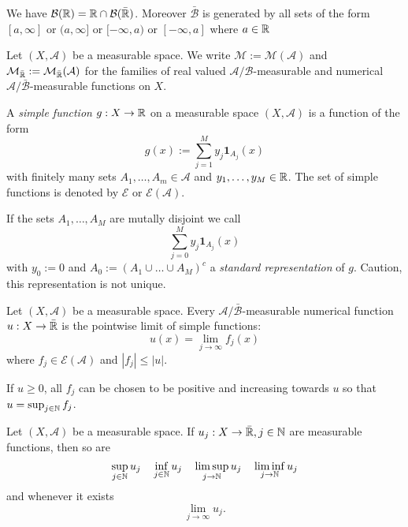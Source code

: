 \begin{thm}
We have \(\mathcal{B}(\Bbb{R})=\Bbb{R}\cap \mathcal{B}(\bar{\Bbb{R}})\). Moreover \(\bar{\mathcal{B}}\) is generated by all sets of the form \([a,\infty ]\) or \((a,\infty ]\) or \([-\infty ,a)\) or \([-\infty ,a]\) where \(a\in \Bbb{R}\)
\end{thm}

\begin{defn}
Let \((X,\mathcal{A})\) be a measurable space. We write \(\mathcal{M}:=\mathcal{M}(\mathcal{A})\) and \(\mathcal{M}_{\bar{\Bbb{R}}}:=\mathcal{M}_{\bar{\Bbb{R}}}(\mathcal{A})\) for the families of real valued \(\mathcal{A}/\mathcal{B}\)-measurable and numerical \(\mathcal{A}/\bar{\mathcal{B}}\)-measurable functions on \(X\).
\end{defn}

\begin{defn}
A \emph{simple function} \(g:X\rightarrow \Bbb{R}\) on a measurable space \((X,\mathcal{A})\) is a function of the form
\[
g(x):=\sum _{j=1}^M y_{j}\mathbf{1}_{A_{j}}(x)
\]
with finitely many sets \(A_{1},\ldots ,A_{m}\in \mathcal{A}\) and \(y_{1},\ldots ,y_M\in \Bbb{R}\). The set of simple functions is denoted by \(\mathcal{E}\) or \(\mathcal{E}(\mathcal{A})\).

If the sets \(A_{1},\ldots ,A_M\) are mutally disjoint we call
\[
\sum _{j=0}^M y_{j}\mathbf{1}_{A_{j}}(x)
\]
with \(y_{0}:=0\) and \(A_{0}:=(A_{1}\cup \ldots \cup A_M)^c\) a \emph{standard representation} of \(g\). Caution, this representation is not unique.
\end{defn}

\begin{thm}
Let \((X,\mathcal{A})\) be a measurable space. Every \(\mathcal{A}/\bar{\mathcal{B}}\)-measurable numerical function \(u:X\rightarrow \bar{\Bbb{R}}\) is the pointwise limit of simple functions:
\[
u(x)=\lim_{j\rightarrow \infty }f_{j}(x)
\]
where \(f_{j}\in \mathcal{E}(\mathcal{A})\) and \(|f_{j}|\leq |u|.\)

If \(u\geq 0\), all \(f_{j}\) can be chosen to be positive and increasing towards \(u\) so that \(u=\sup_{j\in \Bbb{N}}f_{j}\).
\end{thm}

\begin{thm}
Let \((X,\mathcal{A})\) be a measurable space. If \(u_{j}:X\rightarrow \bar{\Bbb{R}}, j\in \Bbb{N}\) are measurable functions, then so are
\[
\sup_{j\in \Bbb{N}}u_{j} \quad \inf_{j\in \Bbb{N}}u_{j} \quad \limsup_{j\rightarrow \Bbb{N}}u_{j}\quad \liminf_{j\rightarrow \Bbb{N}}u_{j}
\]
and whenever it exists
\[
\lim_{j\rightarrow \infty }u_{j}.
\]
\end{thm}

